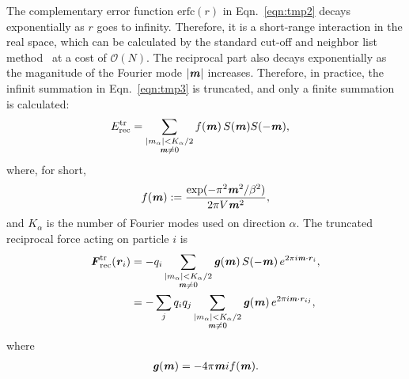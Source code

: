 \documentclass[aps,pre,preprint]{revtex4}
\renewcommand{\v}[1]{\textbf{\textit{#1}}}
\begin{document}
The complementary error function $\textrm{erfc}(r)$ in
Eqn.~\eqref{eqn:tmp2} decays exponentially as $r$ goes to infinity.
Therefore, it is a short-range interaction in the real space, which
can be calculated by the standard cut-off and neighbor list
method~\cite{frenkel02b} at a cost of $\mathcal O(N)$.  The reciprocal
part also decays exponentially as the maganitude of the Fourier mode
$\vert\v m\vert$ increases. Therefore, in practice, the infinit
summation in Eqn.~\eqref{eqn:tmp3} is truncated, and only a finite
summation is calculated:
\begin{align}\label{eqn:tmp6}
  E^{\textrm{tr}}_{\textrm{rec}} & =
  \sum_{
    \begin{subarray}{c}
      \vert m_\alpha\vert < K_\alpha/2\\
      \v m\neq 0
    \end{subarray}}
  f(\v m)\, S(\v m) S(-\v m),
\end{align}
where, for short,
\begin{align}
  f(\v m) := \frac{\exp(-\pi^2 \v m^2 / \beta^2)}{2\pi V \v m^2},
\end{align}
and $K_\alpha$ is the number of Fourier modes used on direction
$\alpha$.  The truncated reciprocal force acting on particle $i$ is
\begin{align}\nonumber
  \v F^{\textrm{tr}}_{\textrm{rec}}(\v r_i)
  &= - 
  q_i 
  \sum_{
    \begin{subarray}{c}
      \vert m_\alpha\vert < K_\alpha/2\\
      \v m\neq 0
    \end{subarray}}
  \v g(\v m) \,
  S(-\v m)\,
  e^{2\pi i\v m\cdot\v r_i}, \\\label{eqn:tmp8}
  &= - 
  \sum_j   q_iq_j
  \sum_{
    \begin{subarray}{c}
      \vert m_\alpha\vert < K_\alpha/2\\
      \v m\neq 0
    \end{subarray}}
  \v g(\v m) \,
  e^{2\pi i\v m\cdot\v r_{ij}},
\end{align}
where
\begin{align}
  \v g(\v m) = -4 \pi \v m i f(\v m).
\end{align}


\end{document}
